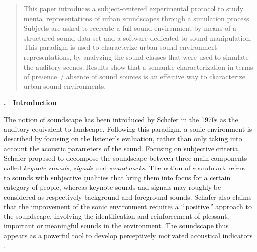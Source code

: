 \documentclass[12pt, titlepage, reqno]{article} %
\renewcommand{\section}[1]{\medskip \addtocounter{section}{1}\raggedright 
     \textbf{\Roman{section}. \ #1}\medskip \setcounter{subsection}{0}
    \setlength{\parindent}{5ex}
 }
\begin{document}
\begin{abstract}
This paper introduces a subject-centered experimental protocol to study mental representations of urban soundscapes through a simulation process. Subjects are asked to recreate a full sound environment by means of a structured sound data set and a  software dedicated to sound manipulation. This paradigm is used to characterize urban sound environment representations, by analyzing the sound classes that were used to simulate the auditory scenes. Results show that a semantic characterization in terms of presence~/ absence of sound sources is an effective way to characterize urban sound environments.
\end{abstract}




 \addtocounter{page}{2}

 \section{Introduction}
 
 \setlength{\parindent}{5ex}


The notion of soundscape has been introduced by Schafer \cite{schafer_new_1969, schafer1977tuning} in the 1970s as the auditory equivalent to landscape. Following this paradigm, a sonic environment is described by focusing on the listener's evaluation, rather than only taking into account the acoustic parameters of the sound. Focusing on subjective criteria, Schafer proposed to decompose the soundscape between three main components called \textit{keynote sounds}, \textit{signals} and \textit{soundmarks}. The notion of soundmark refers to sounds with subjective qualities that bring them into focus for a certain category of people, whereas keynote sounds and signals may roughly be considered as respectively background and foreground sounds. Schafer also claims that the improvement of the sonic environment requires a ``\,positive\,'' approach to the soundscape, involving the identification and reinforcement of pleasant, important or meaningful sounds in the environment. The soundscape thus appears as a powerful tool to develop perceptively motivated acoustical indicators \cite{schulte-fortkamp_soundscape:_2007}.
\end{document}
